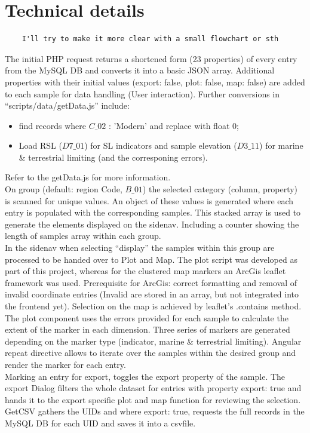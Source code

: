 \documentclass[a4paper,fleqn]{cas-dc}
\begin{document}
\section{Technical details}
\begin{verbatim}
	I'll try to make it more clear with a small flowchart or sth
\end{verbatim}
The initial PHP request returns a shortened form (23 properties) of every entry from the MySQL DB and converts it into a basic JSON array. Additional properties with their initial values (export: false, plot: false, map: false) are added to each sample for data handling (User interaction). Further conversions in ``scripts/data/getData.js'' include: 
\begin{itemize}
	\item find records where $C\_02$ : 'Modern' and replace with float 0;
	\item Load RSL ($D7\_01$) for SL indicators and sample elevation ($D3\_11$) for marine \& terrestrial limiting (and the corresponing errors).
\end{itemize}


Refer to the getData.js for more information.\\
On group (default: region Code, $B\_01$) the selected category (column, property) is scanned for unique values. An object of these values is generated where each entry is populated with the corresponding samples. This stacked array is used to generate the elements displayed on the sidenav. Including a counter showing the length of samples array within each group. \\
In the sidenav when selecting “display” the samples within this group are processed to be handed over to Plot and Map. The plot script was developed as part of this project, whereas for the clustered map markers an ArcGis leaflet framework was used. Prerequisite for ArcGis: correct formatting and removal of invalid coordinate entries (Invalid are stored in an array, but not integrated into the frontend yet). Selection on the map is achieved by leaflet's .contains method. \\ 
The plot component uses the errors provided for each sample to calculate the extent of the marker in each dimension. Three series of markers are generated depending on the marker type (indicator, marine \& terrestrial limiting). Angular repeat directive allows to iterate over the samples within the desired group and render the marker for each entry. \\
Marking an entry for export, toggles the export property of the sample. The export Dialog filters the whole dataset for entries with property export: true and hands it to the export specific plot and map function for reviewing the selection. GetCSV gathers the UIDs and where export: true, requests the full records in the MySQL DB for each UID and saves it into a csvfile.
\end{document}
